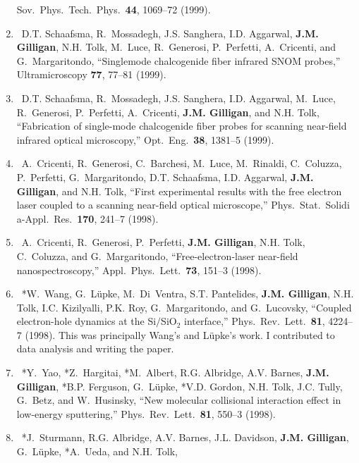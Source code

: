 \begin{enumerate}
    Sov.\ Phys.\ Tech.\ Phys.\ \textbf{44}, 1069--72 (1999). 
%	
    \item
    \textdagger\ 
    D.T. Schaafsma, R.~Mossadegh, J.S. Sanghera, I.D. Aggarwal, \textbf{J.M. Gilligan}, N.H. Tolk, M.~Luce, R.~Generosi, P.~Perfetti, A.~Cricenti, and G.~Margaritondo, 
    \enquote{Singlemode chalcogenide fiber infrared {SNOM} probes,}  
    Ultramicroscopy \textbf{77}, 77--81 (1999). 
%	
    \item
    \textdagger\ 
    D.T. Schaafsma, R.~Mossadegh, J.S. Sanghera, I.D. Aggarwal, M.~Luce, R.~Generosi, P.~Perfetti, A.~Cricenti, \textbf{J.M. Gilligan}, and N.H. Tolk, 
    \enquote{Fabrication of single-mode chalcogenide fiber probes for scanning near-field infrared optical microscopy,}  
    Opt.\ Eng.\ \textbf{38}, 1381--5 (1999). 
%	
    \item
    \textdagger\ 
    A.~Cricenti, R.~Generosi, C.~Barchesi, M.~Luce, M.~Rinaldi, C.~Coluzza, P.~Perfetti, G.~Margaritondo, D.T. Schaafsma, I.D. Aggarwal, \textbf{J.M. Gilligan}, and N.H. Tolk, 
    \enquote{First experimental results with the free electron laser coupled to a scanning near-field optical microscope,}  
    Phys.\ Stat.\ Solidi a-Appl.\ Res.\ \textbf{170}, 241--7 (1998). 
%	
    \item
    \textdagger\ 
    A.~Cricenti, R.~Generosi, P.~Perfetti, \textbf{J.M. Gilligan}, N.H. Tolk, C.~Coluzza, and G.~Margaritondo, 
    \enquote{Free-electron-laser near-field nanospectroscopy,}  
    Appl.\ Phys.\ Lett.\ \textbf{73}, 151--3 (1998). 
%	
    \item
    \textdagger\ 
    *W.~Wang, G.~L\"upke, M.~Di~Ventra, S.T. Pantelides, \textbf{J.M. Gilligan}, N.H. Tolk, I.C. Kizilyalli, P.K. Roy, G.~Margaritondo, and G.~Lucovsky, 
    \enquote{Coupled electron-hole dynamics at the {Si$/$SiO$_2$} interface,}  
    Phys.\ Rev.\ Lett.\ \textbf{81}, 4224--7 (1998). This was principally Wang's and L\"upke's work. I contributed to data analysis and writing the paper.
%	
    \item
    \textdagger\ 
    *Y.~Yao, *Z.~Hargitai, *M.~Albert, R.G. Albridge, A.V. Barnes, \textbf{J.M. Gilligan}, *B.P. Ferguson, G.~L\"upke, *V.D. Gordon, N.H. Tolk, J.C. Tully, G.~Betz, and W.~Husinsky, 
    \enquote{New molecular collisional interaction effect in low-energy sputtering,}  
    Phys.\ Rev.\ Lett.\ \textbf{81}, 550--3 	  (1998).
%	
    \item
    \textdagger\ 
    *J.~Sturmann, R.G. Albridge, A.V. Barnes, J.L. Davidson, \textbf{J.M. Gilligan}, G.~L\"upke, *A.~Ueda, and N.H. Tolk, 

\end{enumerate}

